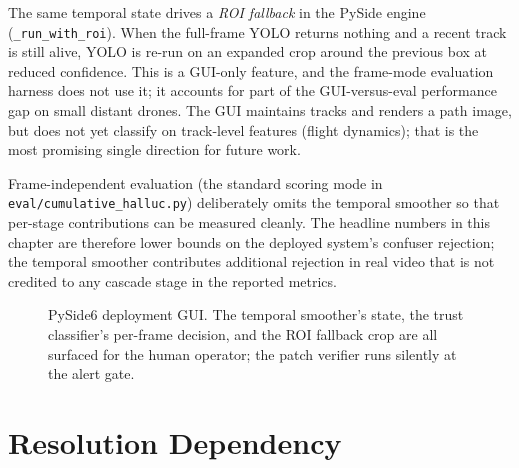 \documentclass[12pt,a4paper,oneside,openright]{book}
\begin{document}
The same temporal state drives a \emph{ROI fallback} in the PySide engine (\texttt{\_run\_with\_roi}). When the full-frame YOLO returns nothing and a recent track is still alive, YOLO is re-run on an expanded crop around the previous box at reduced confidence. This is a GUI-only feature, and the frame-mode evaluation harness does not use it; it accounts for part of the GUI-versus-eval performance gap on small distant drones. The GUI maintains tracks and renders a path image, but does not yet classify on track-level features (flight dynamics); that is the most promising single direction for future work.

Frame-independent evaluation (the standard scoring mode in \texttt{eval/cumulative\_halluc.py}) deliberately omits the temporal smoother so that per-stage contributions can be measured cleanly. The headline numbers in this chapter are therefore lower bounds on the deployed system's confuser rejection; the temporal smoother contributes additional rejection in real video that is not credited to any cascade stage in the reported metrics.

\begin{figure}[htbp]
    \centering
    \caption{PySide6 deployment GUI. The temporal smoother's state, the trust classifier's per-frame decision, and the ROI fallback crop are all surfaced for the human operator; the patch verifier runs silently at the alert gate.}
    \label{fig:pyside_gui}
\end{figure}

\section{Resolution Dependency}
\label{sec:resolution_arch}
\end{document}
